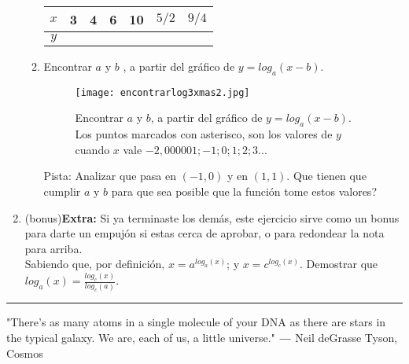 \documentclass[a4paper,11pt,spanish,sans]{exam}
\begin{document}
\begin{enumerate}
\begin{enumerate}
\begin{table}[h]
\centering
\label{my-label}
\begin{tabular}{|c|c|c|c|c|c|c|}
\hline
$x$ & 3 & 4 & 6 & 10 & $5/2$ & $9/4 $  \\ \hline
$y$ & & & & & &  \\ \hline
\end{tabular}
\end{table}


\item  Encontrar $a$ y $b$ ,  a partir del gráfico de $y=log_a(x-b)$.



\begin{figure}[h!]
\centering
\texttt{[image: encontrarlog3xmas2.jpg]}
\caption{Encontrar $a$ y $b$,  a partir del gráfico de $y=log_a(x-b)$.
Los puntos marcados con asterisco, son los valores de $y$ cuando $x$ vale $-2,000001  ;  -1;  0;  1;  2;  3 ... $}
\label{fig:logaritmo}
\end{figure}

Pista: Analizar que pasa en $(-1,0)$ y en $(1,1)$. Que tienen que cumplir $a$ y $b$ para que sea posible que la función tome estos valores?

\end{enumerate}


 \item (bonus)\textbf{Extra:}
 Si ya terminaste los demás, este ejercicio sirve como un bonus para darte un empujón si estas cerca de aprobar, o para redondear la nota para arriba.\\
 
 Sabiendo que, por definición, $x=a^{log_a(x)}$; y $x=c^{log_c(x)}$. Demostrar que $log_a(x)=\frac{log_c(x)}{log_c(a)}$.
 
 \end{enumerate}
 
 \rule[2ex]{\textwidth}{2pt}
 
"There’s as many atoms in a single molecule of your DNA as there are stars in the typical galaxy. We are, each of us, a little universe."
$―$ Neil deGrasse Tyson, Cosmos 






\end{document}
